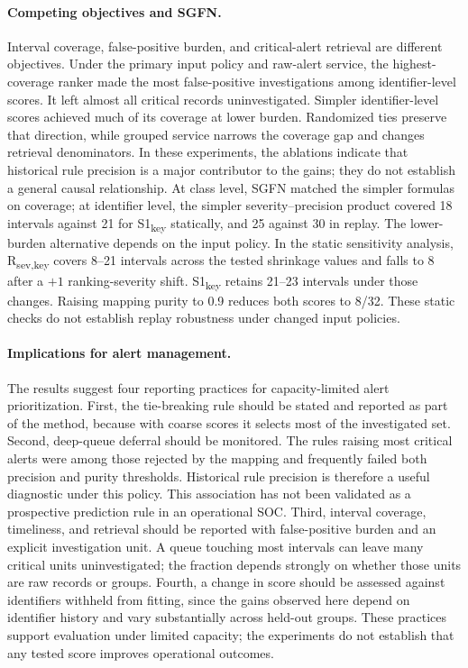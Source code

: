 \documentclass[pdflatex,sn-basic,Numbered]{sn-jnl}
\newcommand{\StaticSOneKeyCovered}{21}
\newcommand{\StaticRSevKeyCovered}{18}
\newcommand{\ReplaySOneKeyCovered}{30}
\newcommand{\ReplayRSevKeyCovered}{25}
\newcommand{\key}{\textsubscript{key}}
\newcommand{\Rsev}{R\textsubscript{sev,key}}
\begin{document}
\paragraph{Competing objectives and SGFN.} Interval coverage, false-positive burden, and critical-alert retrieval are different objectives. Under the primary input policy and raw-alert service, the highest-coverage ranker made the most false-positive investigations among identifier-level scores. It left almost all critical records uninvestigated. Simpler identifier-level scores achieved much of its coverage at lower burden. Randomized ties preserve that direction, while grouped service narrows the coverage gap and changes retrieval denominators. In these experiments, the ablations indicate that historical rule precision is a major contributor to the gains; they do not establish a general causal relationship. At class level, SGFN matched the simpler formulas on coverage; at identifier level, the simpler severity--precision product covered \StaticRSevKeyCovered{} intervals against \StaticSOneKeyCovered{} for S1\key{} statically, and \ReplayRSevKeyCovered{} against \ReplaySOneKeyCovered{} in replay. The lower-burden alternative depends on the input policy. In the static sensitivity analysis, \Rsev{} covers 8--21 intervals across the tested shrinkage values and falls to 8 after a $+1$ ranking-severity shift. S1\key{} retains 21--23 intervals under those changes. Raising mapping purity to 0.9 reduces both scores to 8/32. These static checks do not establish replay robustness under changed input policies.

\paragraph{Implications for alert management.} The results suggest four reporting practices for capacity-limited alert prioritization. First, the tie-breaking rule should be stated and reported as part of the method, because with coarse scores it selects most of the investigated set. Second, deep-queue deferral should be monitored. The rules raising most critical alerts were among those rejected by the mapping and frequently failed both precision and purity thresholds. Historical rule precision is therefore a useful diagnostic under this policy. This association has not been validated as a prospective prediction rule in an operational SOC. Third, interval coverage, timeliness, and retrieval should be reported with false-positive burden and an explicit investigation unit. A queue touching most intervals can leave many critical units uninvestigated; the fraction depends strongly on whether those units are raw records or groups. Fourth, a change in score should be assessed against identifiers withheld from fitting, since the gains observed here depend on identifier history and vary substantially across held-out groups. These practices support evaluation under limited capacity; the experiments do not establish that any tested score improves operational outcomes.
\end{document}
